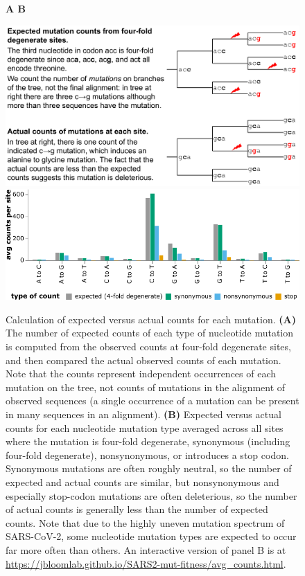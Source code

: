\documentclass[9pt,twocolumn,twoside]{gsajnl_modified}
\begin{document}
\begin{figure}
{\bf \Large A \hspace{0.47\linewidth} B}

\includegraphics[width=0.48\linewidth,valign=t]{figs/schematic/schematic.pdf}
\hspace{0.02\linewidth}
\includegraphics[width=0.5\linewidth,valign=t]{figs/avg_counts.pdf}
\caption{
Calculation of expected versus actual counts for each mutation.
{\bf (A)}
The number of expected counts of each type of nucleotide mutation is computed from the observed counts at four-fold degenerate sites,
and then compared the actual observed counts of each mutation.
Note that the counts represent independent occurrences of each mutation on the tree, not counts of mutations in the alignment of observed sequences (a single occurrence of a mutation can be present in many sequences in an alignment).
{\bf (B)}
Expected versus actual counts for each nucleotide mutation type averaged across all sites where the mutation is four-fold degenerate, synonymous (including four-fold degenerate), nonsynonymous, or introduces a stop codon.
Synonymous mutations are often roughly neutral, so the number of expected and actual counts are similar, but nonsynonymous and especially stop-codon mutations are often deleterious, so the number of actual counts is generally less than the number of expected counts.
Note that due to the highly uneven mutation spectrum of SARS-CoV-2, some nucleotide mutation types are expected to occur far more often than others.
An interactive version of panel B is at \url{https://jbloomlab.github.io/SARS2-mut-fitness/avg_counts.html}.
\label{fig:expected_vs_actual}
}
\end{figure}
\end{document}
